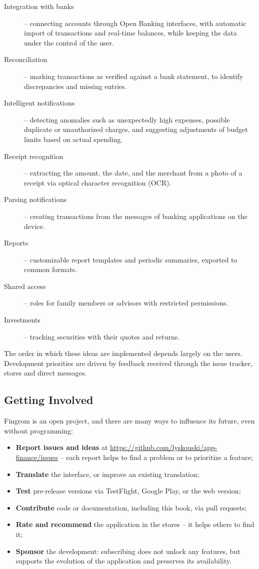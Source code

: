 \begin{description}
  \item[Integration with banks] -- connecting accounts through Open Banking interfaces, with
  automatic import of transactions and real-time balances, while keeping the data under the
  control of the user.
  \item[Reconciliation] -- marking transactions as verified against a bank statement, to
  identify discrepancies and missing entries.
  \item[Intelligent notifications] -- detecting anomalies such as unexpectedly high expenses,
  possible duplicate or unauthorized charges, and suggesting adjustments of budget limits
  based on actual spending.
  \item[Receipt recognition] -- extracting the amount, the date, and the merchant from a
  photo of a receipt via optical character recognition (OCR).
  \item[Parsing notifications] -- creating transactions from the messages of banking
  applications on the device.
  \item[Reports] -- customizable report templates and periodic summaries, exported to common
  formats.
  \item[Shared access] -- roles for family members or advisors with restricted permissions.
  \item[Investments] -- tracking securities with their quotes and returns.
\end{description}

\noindent The order in which these ideas are implemented depends largely on the users.
Development priorities are driven by feedback received through the issue tracker, stores and
direct messages.


\subsection{Getting Involved}

Fingrom is an open project, and there are many ways to influence its future, even without
programming:

\begin{itemize}
  \item \textbf{Report issues and ideas} at
  \href{https://github.com/lyskouski/app-finance/issues}{https://github.com/lyskouski/app-finance/issues}
  -- each report helps to find a problem or to prioritize a feature;
  \item \textbf{Translate} the interface, or improve an existing translation;
  \item \textbf{Test} pre-release versions via TestFlight, Google Play, or the web version;
  \item \textbf{Contribute} code or documentation, including this book, via pull requests;
  \item \textbf{Rate and recommend} the application in the stores -- it helps others to find
  it;
  \item \textbf{Sponsor} the development: subscribing does not unlock any features, but
  supports the evolution of the application and preserves its availability.
\end{itemize}

